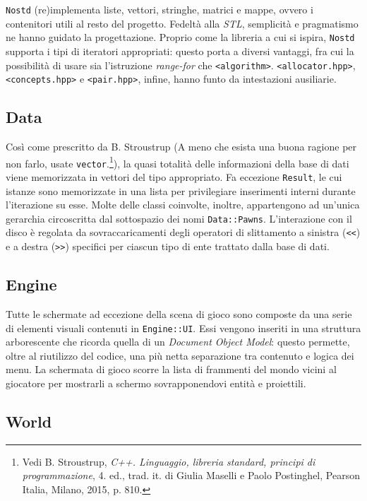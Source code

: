 \documentclass[a4paper]{article}
\begin{document}
\verb!Nostd! (re)implementa liste, vettori, stringhe, matrici e mappe, ovvero i
contenitori utili al resto del progetto. Fedelt\`a alla \emph{STL},
semplicit\`a e pragmatismo ne hanno guidato la progettazione. Proprio come la
libreria a cui si ispira, \verb!Nostd! supporta i tipi di iteratori appropriati:
questo porta a diversi vantaggi, fra cui la possibilit\`a di usare sia
l'istruzione \emph{range-for} che \verb!<algorithm>!. \verb!<allocator.hpp>!,
\verb!<concepts.hpp>! e \verb!<pair.hpp>!, infine, hanno funto da intestazioni
ausiliarie.

\subsection{Data}

Così come prescritto da B. Stroustrup (\guillemotleft A meno che esista una
buona ragione per non farlo, usate \verb!vector!.\guillemotright\footnote{
\label{note1} Vedi B. Stroustrup, \emph{C++.
Linguaggio, libreria standard, principi di programmazione}, 4. ed., trad. it. di
Giulia Maselli e Paolo Postinghel, Pearson Italia, Milano, 2015, p. 810.}), la
quasi totalità delle informazioni della base di dati viene memorizzata in
vettori del tipo appropriato. Fa eccezione \verb!Result!, le cui istanze sono
memorizzate in una lista per privilegiare inserimenti interni durante
l'iterazione su esse. Molte delle classi coinvolte, inoltre, appartengono ad
un'unica gerarchia circoscritta dal sottospazio dei nomi \verb!Data::Pawns!.
L'interazione con il disco \`e regolata da sovraccaricamenti degli operatori di
slittamento a sinistra (\verb!<<!) e a destra (\verb!>>!) specifici per ciascun
tipo di ente trattato dalla base di dati.

\subsection{Engine}

Tutte le schermate ad eccezione della scena di gioco sono composte da una serie
di elementi visuali contenuti in \verb!Engine::UI!. Essi vengono inseriti in una
struttura arborescente che ricorda quella di un \emph{Document Object Model}:
questo permette, oltre al riutilizzo del codice, una più netta separazione tra
contenuto e logica dei menu.
La schermata di gioco scorre la lista di frammenti del mondo vicini al giocatore
per mostrarli a schermo sovrapponendovi entit\`a e proiettili.

\subsection{World}
\end{document}
